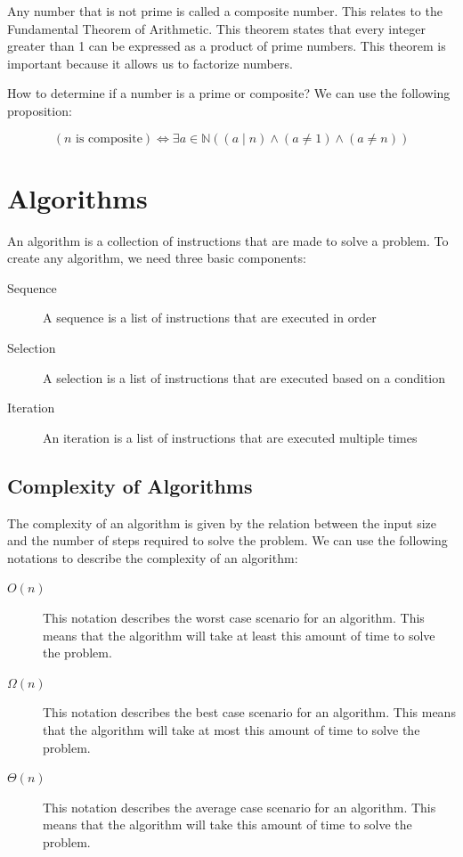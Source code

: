 \documentclass[11pt]{article}
\begin{document}
Any number that is not prime is called a composite number. This relates to the Fundamental Theorem of Arithmetic. This theorem states that every integer greater than 1 can be expressed as a product of prime numbers. This theorem is important because it allows us to factorize numbers.

How to determine if a number is a prime or composite? We can use the following proposition:

\[
(n \text{ is composite})  \Leftrightarrow \exists a \in \mathbb{N} (( a \mid n) \land (a \neq 1) \land (a \neq n))
\]


\section{Algorithms}
\label{sec:org6185414}
An algorithm is a collection of instructions that are made to solve a problem. To create any algorithm, we need three basic components:
\begin{description}
\item[{Sequence}] A sequence is a list of instructions that are executed in order
\item[{Selection}] A selection is a list of instructions that are executed based on a condition
\item[{Iteration}] An iteration is a list of instructions that are executed multiple times
\end{description}

\subsection{Complexity of Algorithms}
\label{sec:org4c29887}
The complexity of an algorithm is given by the relation between the input size and the number of steps required to solve the problem. We can use the following notations to describe the complexity of an algorithm:
\begin{description}
\item[{\(O(n)\)}] This notation describes the worst case scenario for an algorithm. This means that the algorithm will take at least this amount of time to solve the problem.
\item[{\(\Omega(n)\)}] This notation describes the best case scenario for an algorithm. This means that the algorithm will take at most this amount of time to solve the problem.
\item[{\(\Theta(n)\)}] This notation describes the average case scenario for an algorithm. This means that the algorithm will take this amount of time to solve the problem.
\end{description}
\end{document}
